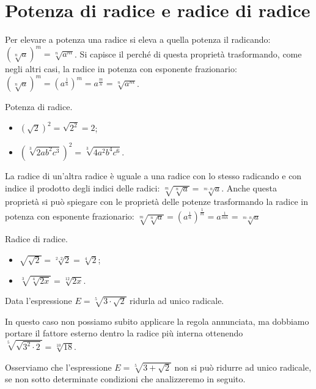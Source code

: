 \section{Potenza di radice e radice di radice}
Per elevare a potenza una radice si eleva a quella potenza il radicando: $\left(\sqrt[n]a\right)^m=\sqrt[n]{a^m}$.
Si capisce il perché di questa proprietà trasformando, come negli altri casi, la radice in potenza con esponente frazionario:
$\left(\sqrt[n]a\right)^m=\left(a^{\frac 1 n}\right)^m=a^{\frac m n}=\sqrt[n]{a^m}$.
\newpage
\begin{exrig}
 \begin{esempio}
 Potenza di radice.
 \begin{multicols}{2}
 \begin{itemize}
 \item $\left(\sqrt 2\right)^2=\sqrt{2^2}=2$;
 \item $\left(\sqrt[3]{2ab^2c^3}\right)^2=\sqrt[3]{4a^2b^4c^6}$.
 \end{itemize}
 \end{multicols}
 \end{esempio}
\end{exrig}

La radice di un'altra radice è uguale a una radice con lo stesso radicando e con indice il prodotto degli indici delle radici: $\sqrt[m]{\sqrt[n]a}=\sqrt[m\cdot n]a$. Anche questa proprietà si può spiegare con le proprietà delle potenze trasformando la radice in potenza con esponente frazionario: $\sqrt[m]{\sqrt[n]a}=\left(a^{\frac 1 n}\right)^{\frac 1 m}=a^{\frac 1{mn}}=\sqrt[m\cdot n]a$
\begin{exrig}
 \begin{esempio}
 Radice di radice.
 \begin{multicols}{2}
 \begin{itemize}
 \item $\sqrt{\sqrt 2}=\sqrt[2\cdot 2]2=\sqrt[4]2$;
 \item $\sqrt[3]{\sqrt[4]{2x}}=\sqrt[12]{2x}$.
 \end{itemize}
 \end{multicols}
 \end{esempio}

 \begin{esempio}
 Data l'espressione $E=\sqrt[5]{3\cdot\sqrt{2}}$ ridurla ad unico radicale.

 In questo caso non possiamo subito applicare la regola annunciata, ma dobbiamo portare il fattore esterno dentro la radice più interna ottenendo $\sqrt[5]{\sqrt{3^2 \cdot 2}}=\sqrt[10]{18}$.

 Osserviamo che l'espressione $E=\sqrt[5]{3+\sqrt{2}}$ non si può ridurre ad unico radicale, se non sotto determinate condizioni che analizzeremo in seguito.
 \end{esempio}
\end{exrig}
\vspazio\ovalbox{\risolvii \ref{ese:2.46}, \ref{ese:2.47}, \ref{ese:2.48}, \ref{ese:2.49}}

